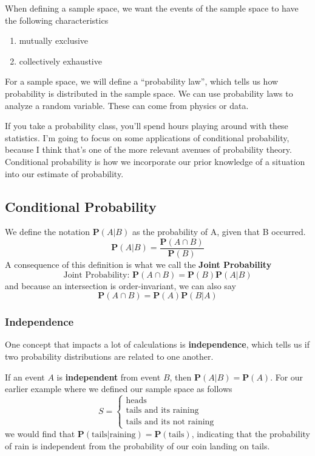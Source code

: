 \documentclass{article}
\begin{document}
When defining a sample space, we want the events of the sample space to have the following characteristics 
\begin{enumerate}
\item\label{item:1} mutually exclusive
\item collectively exhaustive 
\end{enumerate}

For a sample space, we will define a ``probability law'', which tells us how probability is distributed in the sample space. We can use probability laws to analyze a random variable. These can come from physics or data.

If you take a probability class, you'll spend hours playing around with these statistics. I'm going to focus on some applications of conditional probability, because I think that's one of the more relevant avenues of probability theory. Conditional probability is how we incorporate our prior knowledge of a situation into our estimate of probability. 

\subsection{Conditional Probability}
We define the notation $\mathbf{P}(A|B)$ as the probability of A, given that B occurred.
\begin{equation}
\label{eq:6}
\mathbf{P}(A|B) = \frac{\mathbf{P}(A \cap B)}{\mathbf{P}(B)}
\end{equation}
A consequence of this definition is what we call the \textbf{Joint Probability}
\begin{equation}
\label{eq:7}
\text{Joint Probability: }\mathbf{P}(A \cap B) = \mathbf{P}(B) \mathbf{P} (A|B)
\end{equation}
and because an intersection is order-invariant, we can also say 
\begin{equation}
\label{eq:11}
\mathbf{P}(A \cap B) = \mathbf{P}(A) \mathbf{P} (B|A)
\end{equation}

\subsubsection{Independence}
One concept that impacts a lot of calculations is \textbf{independence}, which tells us if two probability distributions are related to one another.

If an event $A$ is \textbf{independent} from event $B$, then $\mathbf{P}(A|B) = \mathbf{P}(A)$. For our earlier example where we defined our sample space as follows
\begin{equation}
\label{eq:5}
S =
\begin{cases}
  \text{heads} \\
  \text{tails and its raining} \\
  \text{tails and its not raining}
\end{cases}
\end{equation}
we would find that $\mathbf{P}(\text{tails}|\text{raining}) = \mathbf{P}(\text{tails})$, indicating that the probability of rain is independent from the probability of our coin landing on tails.
\end{document}

